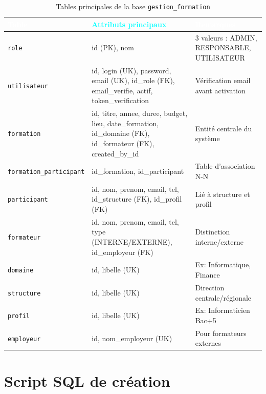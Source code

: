 \documentclass[12pt,a4paper]{report}
\begin{document}
\begin{table}[H]
\centering
\caption{Tables principales de la base \texttt{gestion\_formation}}
\footnotesize
\begin{tabularx}{\textwidth}{|L{4cm}|X|L{3.5cm}|}
\hline
{} \textcolor{white}{\textbf{Table}} & \textcolor{cyan}{\textbf{Attributs principaux}} & \textcolor{white}{\textbf{Remarques}} \\
\hline
\texttt{role} & id (PK), nom & 3 valeurs : ADMIN, RESPONSABLE, UTILISATEUR \\
\hline
\texttt{utilisateur} & id, login (UK), password, email (UK), id\_role (FK), email\_verifie, actif, token\_verification & V\'{e}rification email avant activation \\
\hline
\texttt{formation} & id, titre, annee, duree, budget, lieu, date\_formation, id\_domaine (FK), id\_formateur (FK), created\_by\_id & Entit\'{e} centrale du syst\`{e}me \\
\hline
\texttt{formation\_participant} & id\_formation, id\_participant & Table d'association N-N \\
\hline
\texttt{participant} & id, nom, prenom, email, tel, id\_structure (FK), id\_profil (FK) & Li\'{e} \`{a} structure et profil \\
\hline
\texttt{formateur} & id, nom, prenom, email, tel, type (INTERNE/EXTERNE), id\_employeur (FK) & Distinction interne/externe \\
\hline
\texttt{domaine} & id, libelle (UK) & Ex: Informatique, Finance \\
\hline
\texttt{structure} & id, libelle (UK) & Direction centrale/r\'{e}gionale \\
\hline
\texttt{profil} & id, libelle (UK) & Ex: Informaticien Bac+5 \\
\hline
\texttt{employeur} & id, nom\_employeur (UK) & Pour formateurs externes \\
\hline
\end{tabularx}
\normalsize
\end{table}

\section{Script SQL de cr\'{e}ation}
\end{document}
